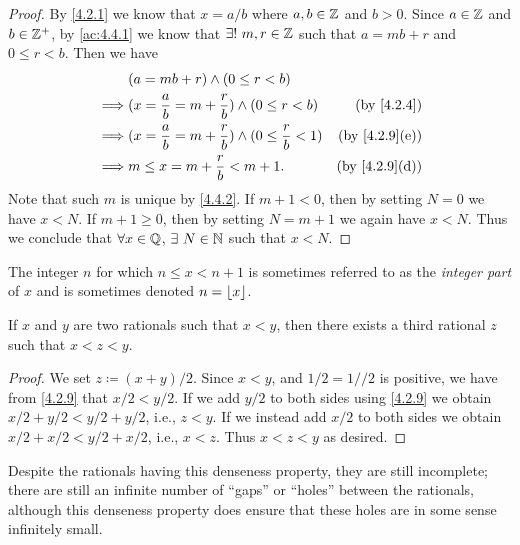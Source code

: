 \begin{proof}
  By \cref{4.2.1} we know that \(x = a / b\) where \(a, b \in \mathbb{Z}\) and \(b > 0\).
  Since \(a \in \mathbb{Z}\) and \(b \in \mathbb{Z}^+\), by \cref{ac:4.4.1} we know that \(\exists!\ m, r \in \mathbb{Z}\) such that \(a = mb + r\) and \(0 \leq r < b\).
  Then we have
  \begin{align*}
             & (a = mb + r) \land (0 \leq r < b)                                                                \\
    \implies & (x = \frac{a}{b} = m + \frac{r}{b}) \land (0 \leq r < b)           & \text{(by \cref{4.2.4})}    \\
    \implies & (x = \frac{a}{b} = m + \frac{r}{b}) \land (0 \leq \frac{r}{b} < 1) & \text{(by \cref{4.2.9}(e))} \\
    \implies & m \leq x = m + \frac{r}{b} < m + 1.                                & \text{(by \cref{4.2.9}(d))}
  \end{align*}
  Note that such \(m\) is unique by \cref{4.4.2}.
  If \(m + 1 < 0\), then by setting \(N = 0\) we have \(x < N\).
  If \(m + 1 \geq 0\), then by setting \(N = m + 1\) we again have \(x < N\).
  Thus we conclude that \(\forall x \in \mathbb{Q}\), \(\exists\ N \in \mathbb{N}\) such that \(x < N\).
\end{proof}

\begin{rmk}\label{4.4.2}
  The integer \(n\) for which \(n \leq x < n + 1\) is sometimes referred to as the \emph{integer part} of \(x\) and is sometimes denoted \(n = \left\lfloor x\right\rfloor\).
\end{rmk}

\begin{prop}\label{4.4.3}
  If \(x\) and \(y\) are two rationals such that \(x < y\), then there exists a third rational \(z\) such that \(x < z < y\).
\end{prop}

\begin{proof}
  We set \(z \coloneqq (x + y) / 2\).
  Since \(x < y\), and \(1 / 2 = 1 // 2\) is positive, we have from \cref{4.2.9} that \(x / 2 < y / 2\).
  If we add \(y / 2\) to both sides using \cref{4.2.9} we obtain \(x / 2 + y / 2 < y / 2 + y / 2\), i.e., \(z < y\).
  If we instead add \(x / 2\) to both sides we obtain \(x / 2 + x / 2 < y / 2 + x / 2\), i.e., \(x < z\).
  Thus \(x < z < y\) as desired.
\end{proof}

\begin{note}
  Despite the rationals having this denseness property, they are still incomplete;
  there are still an infinite number of ``gaps'' or ``holes'' between the rationals, although this denseness property does ensure that these holes are in some sense infinitely small.
\end{note}

